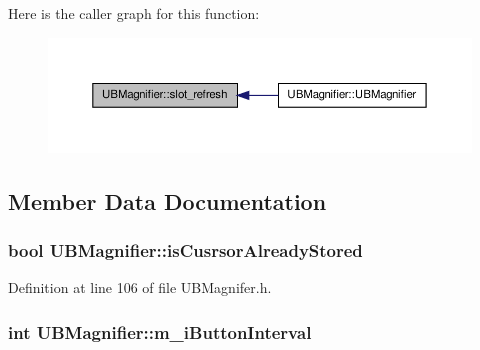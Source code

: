 Here is the caller graph for this function\-:
\nopagebreak
\begin{figure}[H]
\begin{center}
\leavevmode
\includegraphics[width=350pt]{d4/d9d/class_u_b_magnifier_a7497d3351ddbded1b3904d2700517f9a_icgraph}
\end{center}
\end{figure}




\subsection{Member Data Documentation}
\hypertarget{class_u_b_magnifier_a26a82499d8b3bae09816e2f516226d43}{
\subsubsection[{is\-Cusrsor\-Already\-Stored}]{\setlength{\rightskip}{0pt plus 5cm}bool U\-B\-Magnifier\-::is\-Cusrsor\-Already\-Stored\hspace{0.3cm}{\ttfamily [protected]}}}\label{d4/d9d/class_u_b_magnifier_a26a82499d8b3bae09816e2f516226d43}


Definition at line 106 of file U\-B\-Magnifer.\-h.

\hypertarget{class_u_b_magnifier_a2652a040bd98fe55bf49d2ca705b0659}{
\subsubsection[{m\-\_\-i\-Button\-Interval}]{\setlength{\rightskip}{0pt plus 5cm}int U\-B\-Magnifier\-::m\-\_\-i\-Button\-Interval\hspace{0.3cm}{\ttfamily [protected]}}}\label{d4/d9d/class_u_b_magnifier_a2652a040bd98fe55bf49d2ca705b0659}


